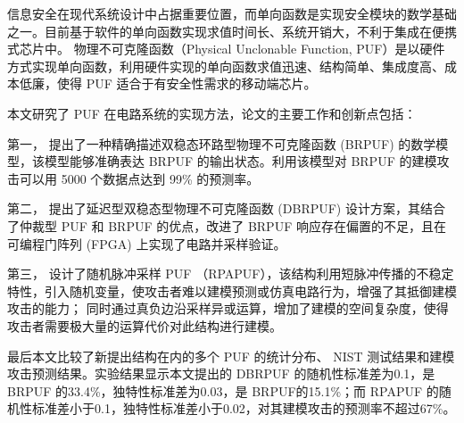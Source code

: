 
\begin{cabstract}
信息安全在现代系统设计中占据重要位置，而单向函数是实现安全模块的数学基础之一。目前基于软件的单向函数实现求值时间长、系统开销大，不利于集成在便携式芯片中。
物理不可克隆函数（Physical Unclonable Function, PUF）是以硬件方式实现单向函数，利用硬件实现的单向函数求值迅速、结构简单、集成度高、成本低廉，使得 PUF 适合于有安全性需求的移动端芯片。

本文研究了 PUF 在电路系统的实现方法，论文的主要工作和创新点包括：

第一，
提出了一种精确描述双稳态环路型物理不可克隆函数 (BRPUF) 的数学模型，该模型能够准确表达 BRPUF 的输出状态。利用该模型对 BRPUF 的建模攻击可以用 5000 个数据点达到 99\% 的预测率。

第二，
提出了延迟型双稳态型物理不可克隆函数 (DBRPUF) 设计方案，其结合了仲裁型 PUF 和 BRPUF 的优点，改进了 BRPUF 响应存在偏置的不足，且在可编程门阵列 (FPGA) 上实现了电路并采样验证。

第三，
设计了随机脉冲采样 PUF （RPAPUF），该结构利用短脉冲传播的不稳定特性，引入随机变量，使攻击者难以建模预测或仿真电路行为，增强了其抵御建模攻击的能力；
同时通过真负边沿采样异或运算，增加了建模的空间复杂度，使得攻击者需要极大量的运算代价对此结构进行建模。

最后本文比较了新提出结构在内的多个 PUF 的统计分布、 NIST 测试结果和建模攻击预测结果。实验结果显示本文提出的 DBRPUF 的随机性标准差为0.1，是 BRPUF 的33.4\%，独特性标准差为0.03，是 BRPUF的15.1\%；而 RPAPUF 的随机性标准差小于0.1，独特性标准差小于0.02，对其建模攻击的预测率不超过67\%。
	
\end{cabstract}

